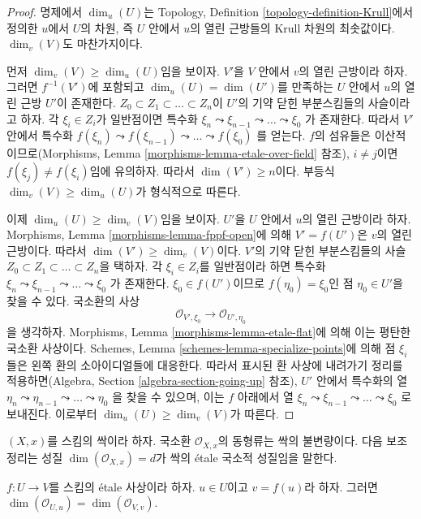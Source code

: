 \begin{proof}
명제에서 $\dim_u(U)$는 Topology, Definition
\ref{topology-definition-Krull}에서 정의한 $u$에서 $U$의 차원, 즉 $U$ 안에서
$u$의 열린 근방들의 Krull 차원의 최솟값이다. $\dim_v(V)$도 마찬가지이다.

\medskip\noindent
먼저 $\dim_v(V) \geq \dim_u(U)$임을 보이자. $V'$을 $V$ 안에서 $v$의 열린
근방이라 하자. 그러면 $f^{-1}(V')$에 포함되고 $\dim_u(U) = \dim(U')$를
만족하는 $U$ 안에서 $u$의 열린 근방 $U'$이 존재한다.
$Z_0 \subset Z_1 \subset \ldots \subset Z_n$이 $U'$의 기약 닫힌
부분스킴들의 사슬이라고 하자. 각 $\xi_i \in Z_i$가 일반점이면
특수화
$\xi_n \leadsto \xi_{n - 1} \leadsto \ldots \leadsto \xi_0$
가 존재한다. 따라서 $V'$ 안에서 특수화
$f(\xi_n) \leadsto f(\xi_{n - 1}) \leadsto \ldots \leadsto f(\xi_0)$
를 얻는다. $f$의 섬유들은 이산적이므로(Morphisms, Lemma
\ref{morphisms-lemma-etale-over-field} 참조), $i \not = j$이면
$f(\xi_j) \not = f(\xi_i)$임에 유의하자. 따라서 $\dim(V') \geq n$이다.
부등식 $\dim_v(V) \geq \dim_u(U)$가 형식적으로 따른다.

\medskip\noindent
이제 $\dim_u(U) \geq \dim_v(V)$임을 보이자. $U'$을 $U$ 안에서 $u$의 열린
근방이라 하자. Morphisms, Lemma \ref{morphisms-lemma-fppf-open}에 의해
$V' = f(U')$은 $v$의 열린 근방이다. 따라서
$\dim(V') \geq \dim_v(V)$이다. $V'$의 기약 닫힌 부분스킴들의 사슬
$Z_0 \subset Z_1 \subset \ldots \subset Z_n$을 택하자. 각
$\xi_i \in Z_i$를 일반점이라 하면 특수화
$\xi_n \leadsto \xi_{n - 1} \leadsto \ldots \leadsto \xi_0$
가 존재한다. $\xi_0 \in f(U')$이므로 $f(\eta_0) = \xi_0$인 점
$\eta_0 \in U'$을 찾을 수 있다. 국소환의 사상
$$
\mathcal{O}_{V', \xi_0} \longrightarrow \mathcal{O}_{U', \eta_0}
$$
을 생각하자. Morphisms, Lemma \ref{morphisms-lemma-etale-flat}에 의해 이는
평탄한 국소환 사상이다. Schemes, Lemma
\ref{schemes-lemma-specialize-points}에 의해 점 $\xi_i$들은 왼쪽 환의
소아이디얼들에 대응한다. 따라서 표시된 환 사상에 내려가기 정리를
적용하면(Algebra, Section \ref{algebra-section-going-up} 참조), $U'$ 안에서
특수화의 열
$\eta_n \leadsto \eta_{n - 1} \leadsto \ldots \leadsto \eta_0$
을 찾을 수 있으며, 이는 $f$ 아래에서 열
$\xi_n \leadsto \xi_{n - 1} \leadsto \ldots \leadsto \xi_0$
로 보내진다. 이로부터 $\dim_u(U) \geq \dim_v(V)$가 따른다.
\end{proof}

\noindent
$(X, x)$를 스킴의 싹이라 하자. 국소환 $\mathcal{O}_{X, x}$의 동형류는
싹의 불변량이다. 다음 보조정리는 성질
$\dim(\mathcal{O}_{X, x}) = d$가 싹의 \'etale 국소적 성질임을 말한다.

\begin{lemma}
\label{lemma-dimension-local-ring-local}
$f : U \to V$를 스킴의 \'etale 사상이라 하자. $u \in U$이고
$v = f(u)$라 하자. 그러면
$\dim(\mathcal{O}_{U, u}) = \dim(\mathcal{O}_{V, v})$.
\end{lemma}

